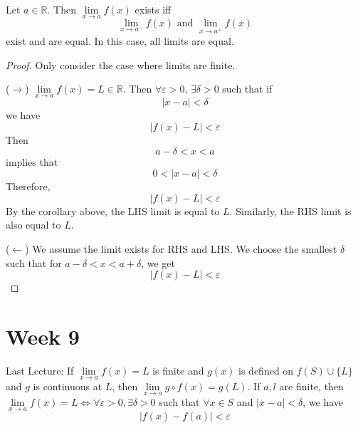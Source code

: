 \documentclass{report}
\begin{document}
\begin{theorem}{20.10}
    Let $a \in \mathbb{R}$. Then $\lim\limits_{x \to a}f(x)$ exists iff
        \begin{equation*}
            \lim\limits_{x \to a^{-}}f(x) \text{ and } \lim\limits_{x \to a^{+}}f(x)
        \end{equation*}
    exist and are equal. In this case, all limits are equal.
\end{theorem}
    \begin{proof}
        Only consider the case where limits are finite. 

        ($\rightarrow$) $\lim\limits_{x \to a}f(x) = L \in \mathbb{R}$. Then $\forall \varepsilon> 0$, $\exists \delta> 0$ such that if
            \begin{equation*}
                \lvert x - a \rvert <  \delta
            \end{equation*}
        we have
            \begin{equation*}
                \lvert f(x) - L \rvert < \varepsilon
            \end{equation*}
        Then 
            \begin{equation*}
                a - \delta < x <  a
            \end{equation*}
        implies that
            \begin{equation*}
                0 < \lvert x - a \rvert < \delta
            \end{equation*}
        Therefore, 
            \begin{equation*}
                \lvert f(x) - L \rvert < \varepsilon
            \end{equation*}
        By the corollary above, the LHS limit is equal to $L$. Similarly, the RHS limit is also equal to $L$.

        ($\leftarrow$) We assume the limit exists for RHS and LHS. We choose the smallest $\delta$ such that for $ a - \delta<x < a + \delta$, we get
            \begin{equation*}
                \lvert f(x) - L \rvert < \varepsilon
            \end{equation*}
    \end{proof}

\chapter{Week 9}

Last Lecture: If $\lim\limits_{x \to a}f(x) = L$ is finite and $g(x)$ is defined on $f(S) \cup \{L\}$ and $g$ is continuous at $L$, then $\lim\limits_{x \to a}g \circ f(x) = g(L)$. If $a, l$ are finite, then $\lim\limits_{x \to a}f(x) = L \iff  \forall \varepsilon > 0, \exists \delta > 0$ such that $\forall x \in S$ and $\lvert x - a \rvert < \delta$, we have
    \begin{equation*}
        \lvert f(x) - f(a)  \rvert< \varepsilon
    \end{equation*}
\end{document}
